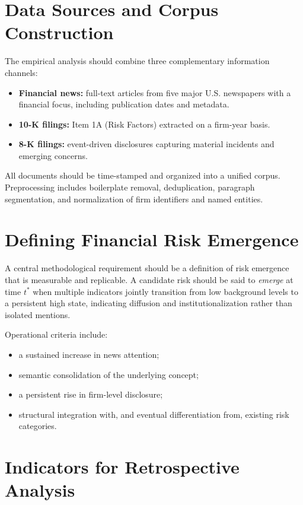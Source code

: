 \documentclass[11pt,a4paper]{article}
\begin{document}
\section{Data Sources and Corpus Construction}

The empirical analysis should combine three complementary information channels:

\begin{itemize}
\item \textbf{Financial news:} full-text articles from five major U.S. newspapers with a financial focus, including publication dates and metadata.
\item \textbf{10-K filings:} Item 1A (Risk Factors) extracted on a firm-year basis.
\item \textbf{8-K filings:} event-driven disclosures capturing material incidents and emerging concerns.
\end{itemize}

All documents should be time-stamped and organized into a unified corpus. Preprocessing includes boilerplate removal, deduplication, paragraph segmentation, and normalization of firm identifiers and named entities.

\section{Defining Financial Risk Emergence}

A central methodological requirement should be a definition of risk emergence that is measurable and replicable. A candidate risk should be said to \emph{emerge} at time $t^*$ when multiple indicators jointly transition from low background levels to a persistent high state, indicating diffusion and institutionalization rather than isolated mentions.

Operational criteria include:
\begin{itemize}
\item a sustained increase in news attention;
\item semantic consolidation of the underlying concept;
\item a persistent rise in firm-level disclosure;
\item structural integration with, and eventual differentiation from, existing risk categories.
\end{itemize}

\section{Indicators for Retrospective Analysis}
\end{document}
